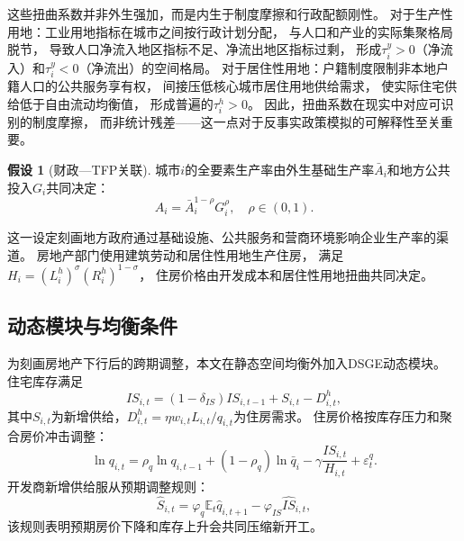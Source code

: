 \documentclass[UTF8,a4paper,12pt]{ctexart}
\theoremstyle{plain}
\theoremstyle{definition}
\newtheorem{assumption}{假设}
\theoremstyle{remark}
\newcommand{\E}{\mathbb{E}}
\newcommand{\Rh}{R^{h}}
\newcommand{\tauy}{\tau^{y}}
\newcommand{\tauh}{\tau^{h}}
\begin{document}
这些扭曲系数并非外生强加，而是内生于制度摩擦和行政配额刚性。
对于生产性用地：工业用地指标在城市之间按行政计划分配，
与人口和产业的实际集聚格局脱节，
导致人口净流入地区指标不足、净流出地区指标过剩，
形成$\tauy_i>0$（净流入）和$\tauy_i<0$（净流出）的空间格局。
对于居住性用地：户籍制度限制非本地户籍人口的公共服务享有权，
间接压低核心城市居住用地供给需求，
使实际住宅供给低于自由流动均衡值，
形成普遍的$\tauh_i>0$。
因此，扭曲系数在现实中对应可识别的制度摩擦，
而非统计残差——这一点对于反事实政策模拟的可解释性至关重要。

\begin{assumption}[财政—TFP关联]
  \label{ass:tfp}
  城市$i$的全要素生产率由外生基础生产率$\bar{A}_i$和地方公共投入$G_i$共同决定：
  \begin{equation}
    A_i=\bar{A}_i^{1-\rho}G_i^\rho,\quad \rho\in(0,1).
    \label{eq:tfp}
  \end{equation}
\end{assumption}
这一设定刻画地方政府通过基础设施、公共服务和营商环境影响企业生产率的渠道。
房地产部门使用建筑劳动和居住性用地生产住房，
满足$H_i=(L_i^h)^\sigma(\Rh_i)^{1-\sigma}$，
住房价格由开发成本和居住性用地扭曲共同决定。

\subsection{动态模块与均衡条件}

为刻画房地产下行后的跨期调整，本文在静态空间均衡外加入DSGE动态模块。
住宅库存满足
\begin{equation}
  IS_{i,t}=(1-\delta_{IS})IS_{i,t-1}+S_{i,t}-D^h_{i,t},
  \label{eq:inventory}
\end{equation}
其中$S_{i,t}$为新增供给，$D^h_{i,t}=\eta w_{i,t}L_{i,t}/q_{i,t}$为住房需求。
住房价格按库存压力和聚合房价冲击调整：
\begin{equation}
  \ln q_{i,t}=\rho_q\ln q_{i,t-1}+(1-\rho_q)\ln\bar{q}_i
  -\gamma\frac{IS_{i,t}}{H_{i,t}}+\varepsilon_t^q.
  \label{eq:price_dyn}
\end{equation}
开发商新增供给服从预期调整规则：
\begin{equation}
  \widehat{S}_{i,t}=\varphi_q\E_t\widehat{q}_{i,t+1}-\varphi_{IS}\widehat{IS}_{i,t},
  \label{eq:developer_rule}
\end{equation}
该规则表明预期房价下降和库存上升会共同压缩新开工。
\end{document}

